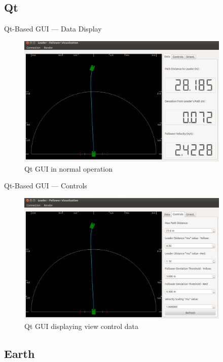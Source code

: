 \documentclass{beamer}
\begin{document}
  \subsection{Qt}

    \begin{frame}{Qt-Based GUI --- Data Display}
      \begin{figure}[ht] \centering
        \includegraphics[width=4in] {../graphics/final_design_data.png}
        \caption{Qt GUI in normal operation} \label{fig:qt_data_display}
      \end{figure}
    \end{frame}

    \begin{frame}{Qt-Based GUI --- Controls}
      \begin{figure}[ht] \centering
        \includegraphics[width=4in] {../graphics/final_design_opts.png}
        \caption{Qt GUI displaying view control data} \label{fig:qt_controls}
      \end{figure}
    \end{frame}

  \subsection{Earth}
\end{document}
